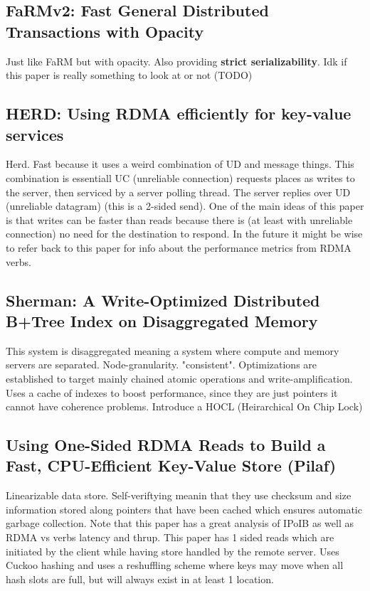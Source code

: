 \documentclass[sigplan,nonacm]{acmart}
\begin{document}
    \subsection{FaRMv2: Fast General Distributed Transactions with Opacity}
    Just like FaRM but with opacity. Also providing \textbf{strict serializability}.
    Idk if this paper is really something to look at or not (TODO)\cite{Shamis-SIGMOD-2019}

    \subsection{HERD: Using RDMA efficiently for key-value services}
    Herd. Fast because it uses a weird combination of UD and message things.
    This combination is essentiall UC (unreliable connection) requests places 
    as writes to the server, then serviced by a server polling thread. The server replies over 
    UD (unreliable datagram) (this is a 2-sided send). One of the main ideas 
    of this paper is that writes can be faster than reads because there is 
    (at least with unreliable connection) no need for the destination to respond. 
    In the future it might be wise to refer back to this paper for info about the performance 
    metrics from RDMA verbs.\cite {Kalia-SIGCOMM-2014}

    \subsection{Sherman: A Write-Optimized Distributed B+Tree Index on Disaggregated Memory}
    This system is disaggregated meaning a system where compute and memory servers are separated. 
    Node-granularity. "consistent". Optimizations are established
    to target mainly chained atomic operations and write-amplification. Uses a cache of indexes to boost 
    performance, since they are just pointers it cannot have coherence problems. Introduce a 
    HOCL (Heirarchical On Chip Lock)\cite{Wang-SIGMOD-2022}

    \subsection{Using One-Sided RDMA Reads to Build a Fast, CPU-Efficient Key-Value Store (Pilaf) }
    Linearizable data store.  Self-veriftying meanin that they use checksum and size information stored along pointers
    that have been cached which ensures automatic garbage collection. Note that this paper has a great 
    analysis of IPoIB as well as RDMA vs verbs latency and thrup. This paper has 1 sided reads which are 
    initiated by the client while having store handled by the remote server. Uses Cuckoo hashing and uses 
    a reshuffling scheme where keys may move when all hash slots are full, but will always exist in at least 1 location.\cite{Mitchell-ATC-2013}
\end{document}
